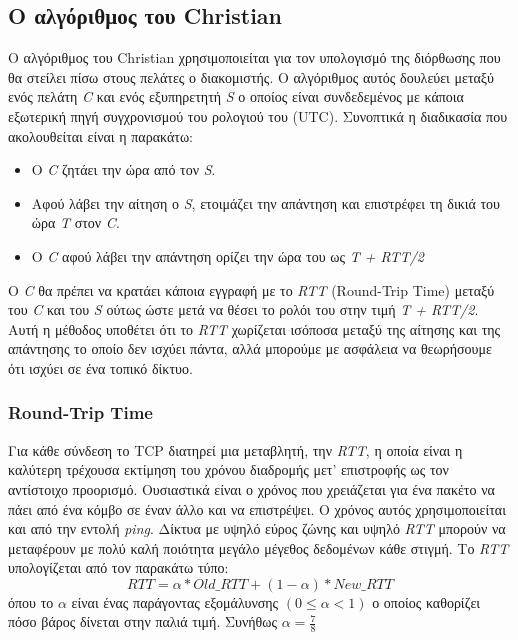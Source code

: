 \documentclass{article}
\begin{document}
\subsection{Ο αλγόριθμος του Christian}
Ο αλγόριθμος του Christian χρησιμοποιείται για τον υπολογισμό της διόρθωσης που
θα στείλει πίσω στους πελάτες ο διακομιστής. Ο αλγόριθμος αυτός δουλεύει μεταξύ
ενός πελάτη \emph{C} και ενός εξυπηρετητή \emph{S} ο οποίος είναι συνδεδεμένος
με κάποια εξωτερική πηγή συγχρονισμού του ρολογιού του (UTC). Συνοπτικά η διαδικασία που
ακολουθείται είναι η παρακάτω:
\begin{itemize}
    \item Ο \emph{C} ζητάει την ώρα από τον \emph{S}.
    \item Αφού λάβει την αίτηση ο \emph{S}, ετοιμάζει την απάντηση και
επιστρέφει τη δικιά του ώρα \emph{T} στον \emph{C}.
    \item Ο \emph{C} αφού λάβει την απάντηση ορίζει την ώρα του ως \emph{T +
RTT/2}
\end{itemize}

Ο \emph{C} θα πρέπει να κρατάει κάποια εγγραφή με το \emph{RTT} (Round-Trip Time) μεταξύ του
\emph{C} και του \emph{S} ούτως ώστε μετά να θέσει το ρολόι του στην τιμή
\emph{T + RTT/2}. Αυτή η μέθοδος υποθέτει ότι το \emph{RTT} χωρίζεται ισόποσα
μεταξύ της αίτησης και της απάντησης το οποίο δεν ισχύει πάντα, αλλά μπορούμε με
ασφάλεια να θεωρήσουμε ότι ισχύει σε ένα τοπικό δίκτυο.

\subsubsection{Round-Trip Time}
Για κάθε σύνδεση το TCP διατηρεί μια μεταβλητή, την \emph{RTT}, η οποία είναι η
καλύτερη τρέχουσα εκτίμηση του χρόνου διαδρομής μετ' επιστροφής ως τον
αντίστοιχο προορισμό. Ουσιαστικά είναι ο χρόνος που χρειάζεται για ένα πακέτο να
πάει από ένα κόμβο σε έναν άλλο και να επιστρέψει. Ο χρόνος αυτός
χρησιμοποιείται και από την εντολή \emph{ping}. Δίκτυα με υψηλό εύρος ζώνης και
υψηλό \emph{RTT} μπορούν να μεταφέρουν με πολύ καλή ποιότητα μεγάλο μέγεθος
δεδομένων κάθε στιγμή. Το \emph{RTT} υπολογίζεται από τον παρακάτω τύπο:
\[ RTT = \alpha * Old\_RTT + (1 - \alpha) * New\_RTT\]
όπου το $\alpha$ είναι ένας παράγοντας εξομάλυνσης $(0 \leq \alpha < 1)$ ο
οποίος καθορίζει πόσο βάρος δίνεται στην παλιά τιμή. Συνήθως $\alpha =
\frac{7}{8}$
\end{document}
